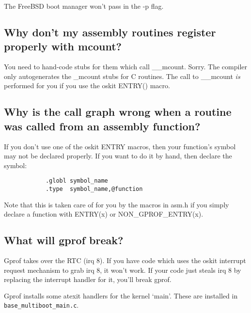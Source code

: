      The FreeBSD boot manager won't pass in the -p flag.

\subsection{Why don't my assembly routines register properly with mcount?}

     You need to hand-code stubs for them which call \_\_mcount.  Sorry.
     The compiler only autogenerates the \_mcount stubs for C
     routines.  The call to \_\_mcount \emph{is} performed for you if
     you use the oskit ENTRY() macro.

\subsection{Why is the call graph wrong when a routine was called from an
     assembly function?}

     If you don't use one of the oskit ENTRY macros, then your function's
     symbol may not be declared properly.  If you want to do it by hand,
     then declare the symbol:
	\begin{verbatim}
            .globl symbol_name
            .type  symbol_name,@function
        \end{verbatim}

     Note that this is taken care of for you by the macros in asm.h if
     you simply declare a function with ENTRY(x) or NON_GPROF_ENTRY(x).

\subsection{What will gprof break?}

Gprof takes over the RTC (irq 8).  If you have code which uses the oskit
interrupt request mechanism to grab irq 8, it won't work.  If your code
just steals irq 8 by replacing the interrupt handler for it, you'll break
gprof.

Gprof installs some atexit handlers for the kernel `main'.  These are
installed in {\tt base_multiboot_main.c}.
